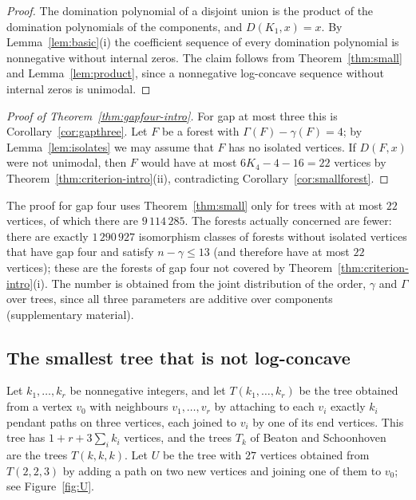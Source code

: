 \begin{proof}
The domination polynomial of a disjoint union is the product of the
domination polynomials of the components, and $D(K_1,x)=x$. By
Lemma~\ref{lem:basic}(i) the coefficient sequence of every domination
polynomial is nonnegative without internal zeros. The claim follows from
Theorem~\ref{thm:small} and Lemma~\ref{lem:product}, since a nonnegative
log-concave sequence without internal zeros is unimodal.
\end{proof}

\begin{proof}[Proof of Theorem~\ref{thm:gapfour-intro}]
For gap at most three this is Corollary~\ref{cor:gapthree}. Let $F$ be a
forest with $\Gamma(F)-\gamma(F)=4$; by Lemma~\ref{lem:isolates} we may
assume that $F$ has no isolated vertices. If $D(F,x)$ were not unimodal,
then $F$ would have at most $6K_4-4-16=22$ vertices by
Theorem~\ref{thm:criterion-intro}(ii), contradicting
Corollary~\ref{cor:smallforest}.
\end{proof}

\begin{remark}\label{rem:boundary}
The proof for gap four uses Theorem~\ref{thm:small} only for trees with at
most $22$ vertices, of which there are $9\,114\,285$. The forests actually
concerned are fewer: there are exactly $1\,290\,927$ isomorphism classes of
forests without isolated vertices that have gap four and satisfy
$n-\gamma\le13$ (and therefore have at most $22$ vertices); these are the
forests of gap four not covered by Theorem~\ref{thm:criterion-intro}(i). The
number is obtained from the joint distribution of the order, $\gamma$ and
$\Gamma$ over trees, since all three parameters are additive over components
(supplementary material).
\end{remark}

\subsection{The smallest tree that is not log-concave}

Let $k_1,\dots,k_r$ be nonnegative integers, and let $T(k_1,\dots,k_r)$ be
the tree obtained from a vertex $v_0$ with neighbours $v_1,\dots,v_r$ by attaching to each
$v_i$ exactly $k_i$ pendant paths on three vertices, each joined to $v_i$ by
one of its end vertices. This tree has $1+r+3\sum_i k_i$ vertices, and the
trees $T_k$ of Beaton and Schoonhoven~\cite{BS} are the trees $T(k,k,k)$.
Let $U$ be the tree with $27$ vertices obtained from $T(2,2,3)$ by adding a
path on two new vertices and joining one of them to $v_0$; see
Figure~\ref{fig:U}.

